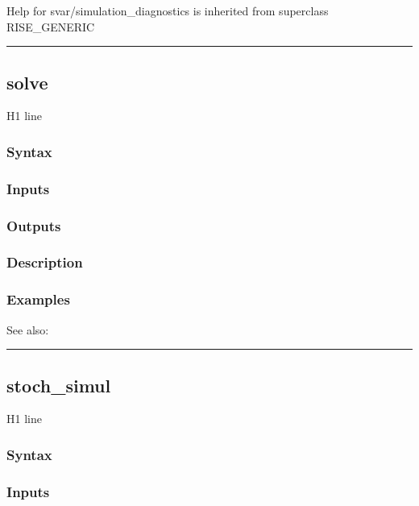 \documentclass[letterpaper,10pt,english]{sphinxmanual}
\begin{document}
Help for svar/simulation\_diagnostics is inherited from superclass RISE\_GENERIC


\bigskip\hrule{}\bigskip



\subsection{solve}
\label{classes/models/@svar/svar:id127}\label{classes/models/@svar/svar:solve}
H1 line


\subsubsection{Syntax}
\label{classes/models/@svar/svar:id128}

\subsubsection{Inputs}
\label{classes/models/@svar/svar:id129}

\subsubsection{Outputs}
\label{classes/models/@svar/svar:id130}

\subsubsection{Description}
\label{classes/models/@svar/svar:id131}

\subsubsection{Examples}
\label{classes/models/@svar/svar:id132}
See also:


\bigskip\hrule{}\bigskip



\subsection{stoch\_simul}
\label{classes/models/@svar/svar:id133}\label{classes/models/@svar/svar:stoch-simul}
H1 line


\subsubsection{Syntax}
\label{classes/models/@svar/svar:id134}

\subsubsection{Inputs}
\label{classes/models/@svar/svar:id135}
\end{document}
